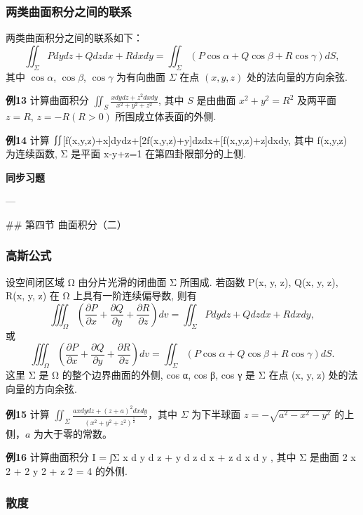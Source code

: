 \subsubsection*{两类曲面积分之间的联系}


两类曲面积分之间的联系如下：
\[ \iint_{\Sigma} Pdy dz + Qdz dx + Rdx dy = \iint_{\Sigma} (P \cos \alpha + Q \cos \beta + R \cos \gamma) dS, \]
其中 \(\cos \alpha\), \(\cos \beta\), \(\cos \gamma\) 为有向曲面 \(\Sigma\) 在点 \((x, y, z)\) 处的法向量的方向余弦.

\textbf{例13}
计算曲面积分 \(\iint_S \frac{x dy dz + z^2 dx dy}{x^2 + y^2 + z^2}\), 其中 \(S\) 是由曲面 \(x^2 + y^2 = R^2\) 及两平面 \(z = R\), \(z = -R(R > 0)\) 所围成立体表面的外侧.

\textbf{例14}
计算
∬[f(x,y,z)+x]dydz+[2f(x,y,z)+y]dzdx+[f(x,y,z)+z]dxdy, 其中 f(x,y,z) 为连续函数, Σ 是平面 x-y+z=1 在第四卦限部分的上侧.


\medskip
\textbf{同步习题}
\medskip

---

## 第四节 曲面积分（二）


\subsubsection*{高斯公式}


设空间闭区域 Ω 由分片光滑的闭曲面 Σ 所围成. 若函数 P(x, y, z), Q(x, y, z), R(x, y, z) 在 Ω 上具有一阶连续偏导数, 则有
\[ \iiint_{\Omega} \left( \frac{\partial P}{\partial x} + \frac{\partial Q}{\partial y} + \frac{\partial R}{\partial z} \right) dv = \iint_{\Sigma} P dy dz + Q dz dx + R dx dy, \]
或
\[ \iiint_{\Omega} \left( \frac{\partial P}{\partial x} + \frac{\partial Q}{\partial y} + \frac{\partial R}{\partial z} \right) dv = \iint_{\Sigma} (P \cos \alpha + Q \cos \beta + R \cos \gamma) dS. \]
这里 Σ 是 Ω 的整个边界曲面的外侧, cos α, cos β, cos γ 是 Σ 在点 (x, y, z) 处的法向量的方向余弦.

\textbf{例15}
计算 \(\iint_{\Sigma} \frac{axdy dz + (z+a)^2 dxdy}{(x^2 + y^2 + z^2)^{\frac{1}{2}}}\)，其中 \(\Sigma\) 为下半球面 \(z = -\sqrt{a^2 - x^2 - y^2}\) 的上侧，\(a\) 为大于零的常数。

\textbf{例16}
计算曲面积分 I = ∫Σ x d y d z + y d z d x + z d x d y , 其中 Σ 是曲面 2 x 2 + 2 y 2 + z 2 = 4 的外侧.


\subsubsection*{散度}



